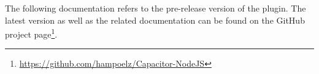 \vspace{1em}

The following documentation refers to the pre-release version  of the plugin.
The latest version as well as the related documentation can be found on the GitHub project page\footnote{\url{https://github.com/hampoelz/Capacitor-NodeJS}}.

\clearpage



\clearpage


\clearpage


\clearpage


\clearpage


\clearpage


